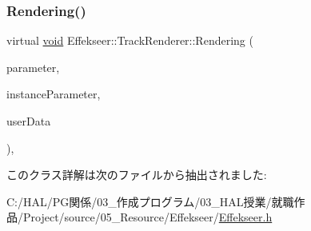 \subsubsection{\texorpdfstring{Rendering()}{Rendering()}}
{\footnotesize\ttfamily virtual \mbox{\hyperlink{namespace_effekseer_ab34c4088e512200cf4c2716f168deb56}{void}} Effekseer\+::\+Track\+Renderer\+::\+Rendering (\begin{DoxyParamCaption}\item[{const \mbox{\hyperlink{struct_effekseer_1_1_track_renderer_1_1_node_parameter}{Node\+Parameter}} \&}]{parameter,  }\item[{const \mbox{\hyperlink{struct_effekseer_1_1_track_renderer_1_1_instance_parameter}{Instance\+Parameter}} \&}]{instance\+Parameter,  }\item[{\mbox{\hyperlink{namespace_effekseer_ab34c4088e512200cf4c2716f168deb56}{void}} $\ast$}]{user\+Data }\end{DoxyParamCaption})\hspace{0.3cm}{\ttfamily [inline]}, {\ttfamily [virtual]}}



このクラス詳解は次のファイルから抽出されました\+:\begin{DoxyCompactItemize}
\item 
C\+:/\+H\+A\+L/\+P\+G関係/03\+\_\+作成プログラム/03\+\_\+\+H\+A\+L授業/就職作品/\+Project/source/05\+\_\+\+Resource/\+Effekseer/\mbox{\hyperlink{_effekseer_8h}{Effekseer.\+h}}\end{DoxyCompactItemize}
